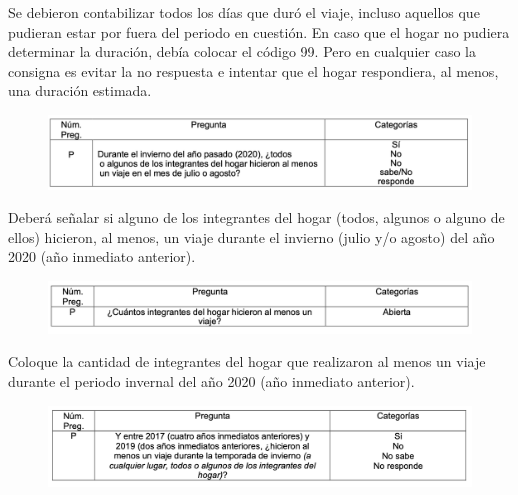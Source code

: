 \documentclass[
  openany]{book}
\begin{document}
Se debieron contabilizar todos los días que duró el viaje, incluso aquellos que pudieran estar por fuera del periodo en cuestión. En caso que el hogar no pudiera determinar la duración, debía colocar el código 99. Pero en cualquier caso la consigna es evitar la no respuesta e intentar que el hogar respondiera, al menos, una duración estimada.

\begin{figure}

{\centering \includegraphics[width=1\linewidth]{imagenes/figura6-314} 

}

\end{figure}

Deberá señalar si alguno de los integrantes del hogar (todos, algunos o alguno de ellos) hicieron, al menos, un viaje durante el invierno (julio y/o agosto) del año 2020 (año inmediato anterior).

\begin{figure}

{\centering \includegraphics[width=1\linewidth]{imagenes/figura6-315} 

}

\end{figure}

Coloque la cantidad de integrantes del hogar que realizaron al menos un viaje durante el periodo invernal del año 2020 (año inmediato anterior).

\begin{figure}

{\centering \includegraphics[width=1\linewidth]{imagenes/figura6-316} 

}

\end{figure}
\end{document}
